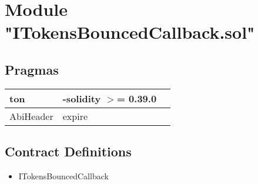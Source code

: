 
\section{Module "ITokensBouncedCallback.sol"}


\subsection{Pragmas}


\noindent\begin{tabular}{|l|l|p{5cm}|}\hline
ton & -solidity $>$= 0.39.0 &\\\hline
AbiHeader &  expire &\\\hline
\end{tabular}


\subsection{Contract Definitions}

\begin{itemize}
\item ITokensBouncedCallback
\end{itemize}
